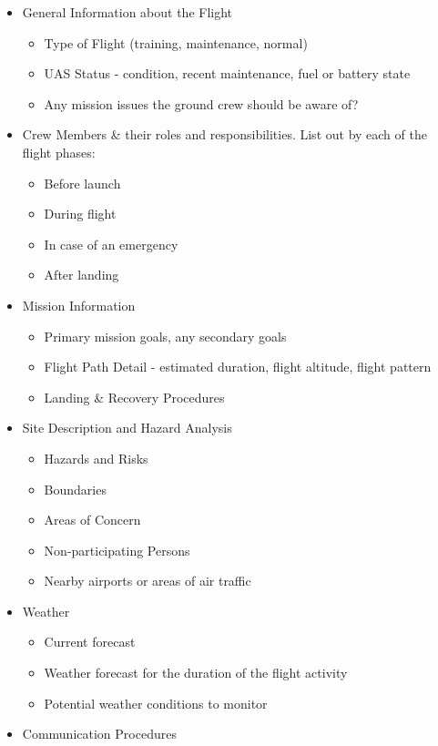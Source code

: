 \documentclass[
]{book}
\providecommand{\tightlist}{%
  \setlength{\itemsep}{0pt}\setlength{\parskip}{0pt}}
\begin{document}
\begin{itemize}
\item
  General Information about the Flight

  \begin{itemize}
  \tightlist
  \item
    Type of Flight (training, maintenance, normal)
  \item
    UAS Status - condition, recent maintenance, fuel or battery state
  \item
    Any mission issues the ground crew should be aware of?
  \end{itemize}
\item
  Crew Members \& their roles and responsibilities. List out by each of the flight phases:

  \begin{itemize}
  \tightlist
  \item
    Before launch
  \item
    During flight
  \item
    In case of an emergency
  \item
    After landing
  \end{itemize}
\item
  Mission Information

  \begin{itemize}
  \tightlist
  \item
    Primary mission goals, any secondary goals
  \item
    Flight Path Detail - estimated duration, flight altitude, flight pattern
  \item
    Landing \& Recovery Procedures
  \end{itemize}
\item
  Site Description and Hazard Analysis

  \begin{itemize}
  \tightlist
  \item
    Hazards and Risks
  \item
    Boundaries
  \item
    Areas of Concern
  \item
    Non-participating Persons
  \item
    Nearby airports or areas of air traffic
  \end{itemize}
\item
  Weather

  \begin{itemize}
  \tightlist
  \item
    Current forecast
  \item
    Weather forecast for the duration of the flight activity
  \item
    Potential weather conditions to monitor
  \end{itemize}
\item
  Communication Procedures


\end{itemize}
\end{document}
